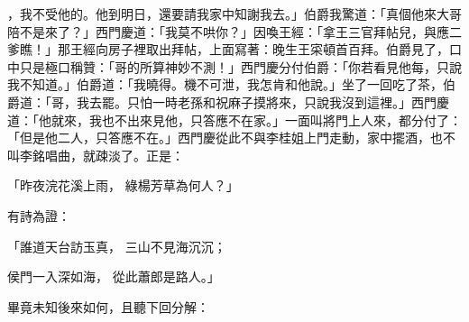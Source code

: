 \begin{showcontents}{}
，我不受他的。他到明日，還要請我家中知謝我去。」伯爵我驚道：「真個他來大哥陪不是來了？」西門慶道：「我莫不哄你？」因喚王經：「拿王三官拜帖兒，與應二爹瞧！」那王經向房子裡取出拜帖，上面寫著：晚生王寀頓首百拜。伯爵見了，口中只是極口稱贊：「哥的所算神妙不測！」西門慶分付伯爵：「你若看見他每，只說我不知道。」伯爵道：「我曉得。機不可泄，我怎肯和他說。」坐了一回吃了茶，伯爵道：「哥，我去罷。只怕一時老孫和祝麻子摸將來，只說我沒到這裡。」西門慶道：「他就來，我也不出來見他，只答應不在家。」一面叫將門上人來，都分付了：「但是他二人，只答應不在。」西門慶從此不與李桂姐上門走動，家中擺酒，也不叫李銘唱曲，就疎淡了。正是：

「昨夜浣花溪上雨，  綠楊芳草為何人？」

有詩為證：

「誰道天台訪玉真，  三山不見海沉沉；

侯門一入深如海，  從此蕭郎是路人。」

畢竟未知後來如何，且聽下回分解：





\end{showcontents}


